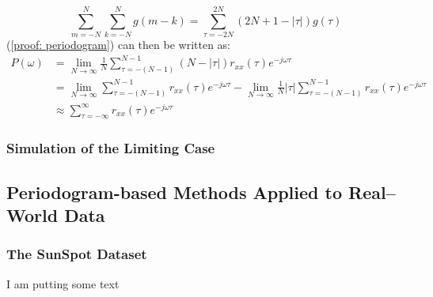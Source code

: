 \documentclass[12pt]{article}
\begin{document}
	\begin{equation}
		\sum_{m=-N}^{N} \sum_{k=-N}^{N} g(m-k) = \sum_{\tau=-2N}^{2N}(2N + 1 - |\tau|)g(\tau)
		\label{proof: periodogram:helper}
	\end{equation}
	\newline
	(\ref{proof: periodogram}) can then be written as:
	\vspace{-\baselineskip}
	\begin{align}
		P(\omega)    & =         \lim_{N\to\infty} \frac{1}{N} \sum_{\tau=-(N-1)}^{N-1}(N - |\tau|)r_{xx}(\tau) e^{-j\omega\tau}\nonumber\\
		& =         \lim_{N\to\infty} \sum_{\tau=-(N-1)}^{N-1} r_{xx}(\tau) e^{-j\omega\tau} -
		\lim_{N\to\infty} \frac{1}{N} |\tau| \sum_{\tau=-(N-1)}^{N-1} r_{xx}(\tau) e^{-j\omega\tau}\nonumber\\
		& \approx   \sum_{\tau=-\infty}^{\infty} r_{xx}(\tau) e^{-j\omega\tau}
		\label{proof: periodogram:shown}
	\end{align}
	
	\subsubsection{Simulation of the Limiting Case} \label{sec: 1-1b-prop-PSD}
	
	
	\subsection{Periodogram-based Methods Applied to Real–World Data} \label{sec: 1-2-PSD-real-world}
	\subsubsection{The SunSpot Dataset}
	I am putting some text
\end{document}
